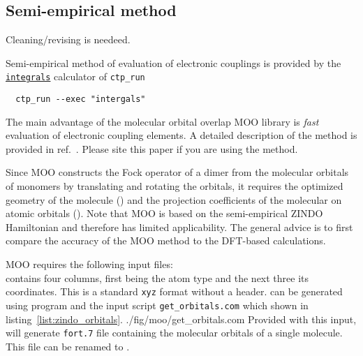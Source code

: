 \subsection{Semi-empirical method}
\label{sec:moo}

{\color{red} Cleaning/revising is needeed.}

\newcommand{\integrals}{\hyperref[calc:integrals]{\texttt{integrals}}\xspace}
\newcommand{\overlap}{\hyperref[prog:moo_overlap]{\texttt{moo\_overlap}}\xspace}
\newcommand{\moo}{MOO\xspace}

Semi-empirical method of evaluation of electronic couplings is provided by the \integrals calculator of \texttt{ctp\_run} 
\begin{verbatim}
  ctp_run --exec "intergals"
\end{verbatim}

The main advantage of the molecular orbital overlap \moo library is {\em fast} evaluation of electronic coupling elements. A detailed description of the method is provided in ref.~\cite{kirkpatrick_approximate_2008}. Please site this paper if you are using the method.

Since \moo constructs the Fock operator of a dimer from the  molecular orbitals of monomers by translating and rotating the orbitals, it requires the optimized geometry of the molecule (\xyz) and the projection coefficients of the molecular on atomic orbitals (\orb). Note that \moo is based on the semi-empirical ZINDO Hamiltonian and therefore has limited applicability. The general advice is to first compare the accuracy of the \moo method to the DFT-based calculations. 

\moo requires the following input files: \\
\noindent
\xyz contains four columns, first being the atom type and the next three its coordinates. This is a standard \texttt{xyz} format without a header. 
\vskip 0.1cm
\noindent
\orb can be generated using \gaussian program and the input script \texttt{get\_orbitals.com} which shown in listing~\ref{list:zindo_orbitals}.
\vskip 0.1cm
\noindent
%
{./fig/moo/get_orbitals.com}
%
Provided with this input, \gaussian will generate \texttt{fort.7} file containing the molecular orbitals of a single molecule. This file can be renamed to \orb. 

